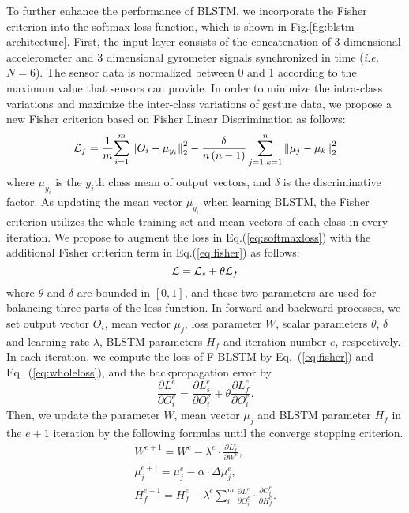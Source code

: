 \documentclass[review]{elsarticle}
\begin{document}
To further enhance the performance of BLSTM, we incorporate the Fisher criterion into the softmax loss function, which is shown in Fig.\;\ref{fig:blstm-architecture}. First, the input layer consists of the concatenation of 3 dimensional accelerometer and 3 dimensional gyrometer signals synchronized in time (\emph{i.e.} $N=6$). The sensor data is normalized between 0 and 1 according to the maximum value that sensors can provide.
In order to minimize the intra-class variations and maximize the inter-class variations of gesture data, we propose a new Fisher criterion based on Fisher Linear Discrimination as follows:
\begin{equation}{\cal L}_f
	= \frac{1}{m}{\sum\limits_{i = 1}^m {\left\| {{O_i} - {\mu_{{y_i}}}} \right\|_2^2}  - \frac{\delta}{n\left(n-1\right)} \sum\limits_{j = 1,k = 1}^n {\left\| {{\mu_j} - {\mu_k}} \right\|_2^2} }
	\label{eq:fisher}
\end{equation}
where ${\mu_{{y_i}}}$ is the $y_i$th class mean of output vectors, and $\delta$ is the discriminative factor. As updating the mean vector ${\mu_{{y_i}}}$ when learning BLSTM, the Fisher criterion utilizes the whole training set and mean vectors of each class in every iteration. We propose to augment the loss in Eq.\;(\ref{eq:softmaxloss}) with the additional Fisher criterion term in Eq.\;(\ref{eq:fisher}) as follows:
\begin{equation}
	{\cal L} 
	= {\cal L}_s +\theta{\cal L}_f \\
	\label{eq:wholeloss}
\end{equation}
where $\theta$ and $\delta$ are bounded in $[0,1]$, and these two parameters are used for balancing three parts of the loss function. In forward and backward processes, we set output vector ${O_i}$, mean vector ${\mu_j}$, loss parameter $W$, scalar parameters $\theta$, $\delta$ and learning rate $\lambda$, BLSTM parameters $H_f$ and iteration number $e$, respectively. In each iteration, we compute the loss of F-BLSTM by Eq.~(\ref{eq:fisher}) and Eq.~(\ref{eq:wholeloss}), and the backpropagation error by
\begin{equation}
	\frac{{\partial {L^e}}}{{\partial O_i^e}} = \frac{{\partial L_s^e}}{{\partial O_i^e}} + \theta \frac{{\partial L_f^e}}{{\partial O_i^e}}.
	\label{eq:backerror}
\end{equation}
Then, we update the parameter $W$, mean vector $\mu_{j}$ and BLSTM parameter $H_f$ in the $e+1$ iteration by the following formulas until the converge stopping criterion.
\begin{equation}
	\begin{array}{l}
	{W^{e + 1}} = {W^e} - {\lambda ^e} \cdot \frac{{\partial L_f^e}}{{\partial {W^e}}},\\
	\mu _j^{e + 1} = \mu _j^e - \alpha  \cdot \Delta \mu _j^e,\\
	H_f^{e + 1} = H_f^e - {\lambda ^e}\sum\nolimits_i^m {\frac{{\partial {L^e}}}{{\partial O_i^e}}}  \cdot \frac{{\partial O_i^e}}{{\partial H_f^e}}.
	\end{array}
	\label{eq:parmean}
\end{equation}
\end{document}
